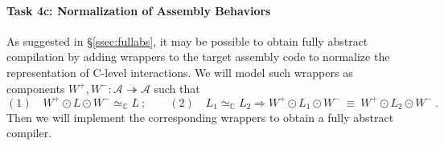 \vspace*{-2ex}
\paragraph*{Task 4c: Normalization of Assembly Behaviors}

As suggested in \S\ref{ssec:fullabs},
it may be possible to obtain fully abstract compilation
by adding wrappers to the target assembly code
to normalize the representation of C-level interactions.
We will model such wrappers as components
$W^+, W^- : \mathcal{A} \twoheadrightarrow \mathcal{A}$
such that
\[
  (1)\quad
  W^+ \odot L \odot W^- \simeq_\mathbb{C} L
  \:;\qquad
  (2)\quad
  L_1 \simeq_\mathbb{C} L_2 \Rightarrow
     W^+ \odot L_1 \odot W^- \:\equiv\:
     W^+ \odot L_2 \odot W^-
  \:.
\]
Then we will implement the corresponding wrappers
to obtain a fully abstract compiler.
